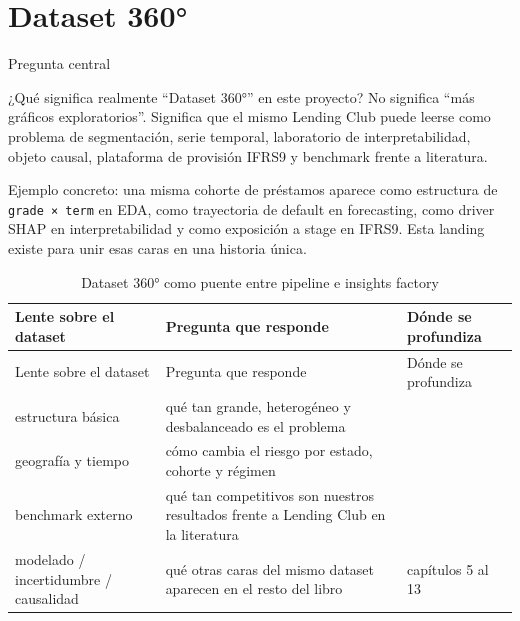 \documentclass[
  spanish,
  11pt,
  letterpaper,
]{scrbook}
\theoremstyle{plain}
\theoremstyle{remark}
\begin{document}
\chapter{Dataset 360°}\label{dataset-360}

{Pregunta central}

¿Qué significa realmente ``Dataset 360°'' en este proyecto? No significa
``más gráficos exploratorios''. Significa que el mismo Lending Club
puede leerse como problema de segmentación, serie temporal, laboratorio
de interpretabilidad, objeto causal, plataforma de provisión IFRS9 y
benchmark frente a literatura.

Ejemplo concreto: una misma cohorte de préstamos aparece como estructura
de \texttt{grade\ ×\ term} en EDA, como trayectoria de default en
forecasting, como driver SHAP en interpretabilidad y como exposición a
stage en IFRS9. Esta landing existe para unir esas caras en una historia
única.

\begin{longtable}[]{@{}
  >{\raggedright\arraybackslash}p{}
  >{\raggedright\arraybackslash}p{}
  >{\raggedright\arraybackslash}p{}@{}}
\caption{Dataset 360° como puente entre pipeline e insights
factory}\label{tbl-dataset360-bridge}\tabularnewline
\toprule\noalign{}
\begin{minipage}[b]{\linewidth}\raggedright
Lente sobre el dataset
\end{minipage} & \begin{minipage}[b]{\linewidth}\raggedright
Pregunta que responde
\end{minipage} & \begin{minipage}[b]{\linewidth}\raggedright
Dónde se profundiza
\end{minipage} \\
\midrule\noalign{}
\endfirsthead
\toprule\noalign{}
\begin{minipage}[b]{\linewidth}\raggedright
Lente sobre el dataset
\end{minipage} & \begin{minipage}[b]{\linewidth}\raggedright
Pregunta que responde
\end{minipage} & \begin{minipage}[b]{\linewidth}\raggedright
Dónde se profundiza
\end{minipage} \\
\midrule\noalign{}
\endhead
\bottomrule\noalign{}
\endlastfoot
estructura básica & qué tan grande, heterogéneo y desbalanceado es el
problema & 51 \\
geografía y tiempo & cómo cambia el riesgo por estado, cohorte y régimen
& 52 \\
benchmark externo & qué tan competitivos son nuestros resultados frente
a Lending Club en la literatura & 53 \\
modelado / incertidumbre / causalidad & qué otras caras del mismo
dataset aparecen en el resto del libro & capítulos 5 al 13 \\
\end{longtable}
\end{document}
